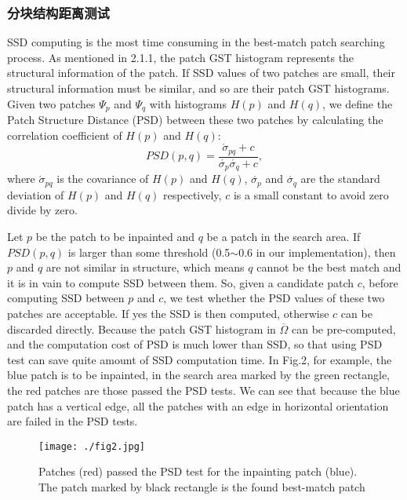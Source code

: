 \subsubsection{分块结构距离测试}
\label{sec:2.2.1}
SSD computing is the most time consuming in the best-match patch searching process. As mentioned in 2.1.1, the patch GST histogram represents the structural information of the patch. If SSD values of two patches are small, their structural information must be similar, and so are their patch GST histograms. Given two patches \(\Psi_p\) and \(\Psi_q\) with histograms \(H(p)\) and \(H(q)\), we define the Patch Structure Distance (PSD) between these two patches by calculating the correlation coefficient of \(H(p)\) and \(H(q)\):
$$PSD(p,q)=\frac{\acute{\sigma}_{pq}+c}{\acute{\sigma_p}\acute{\sigma_q}+c},$$
where \(\acute{\sigma}_{pq}\) is the covariance of \(H(p)\) and \(H(q)\), \(\acute{\sigma_p}\) and \(\acute{\sigma_q}\) are the standard deviation of \(H(p)\) and \(H(q)\) respectively, \(c\) is a small constant to avoid zero divide by zero.\par
Let \(p\) be the patch to be inpainted and \(q\) be a patch in the search area. If \(PSD(p,q)\) is larger than some threshold (0.5\(\sim\)0.6 in our implementation), then \(p\) and \(q\) are not similar in structure, which means \(q\) cannot be the best match and it is in vain to compute SSD between them. So, given a candidate patch \(c\), before computing SSD between \(p\) and \(c\), we test whether the PSD values of these two patches are acceptable. If yes the SSD is then computed, otherwise \(c\) can be discarded directly. Because the patch GST histogram in \(\overline{\Omega}\)  can be pre-computed, and the computation cost of PSD is much lower than SSD, so that using PSD test can save quite amount of SSD computation time. In Fig.2, for example, the blue patch is to be inpainted, in the search area marked by the green rectangle, the red patches are those passed the PSD tests. We can see that because the blue patch has a vertical edge, all the patches with an edge in horizontal orientation are failed in the PSD tests.
\begin{figure}[!htbp]
	\begin{center}
			\texttt{[image: ./fig2.jpg]}
	\end{center}
    \caption{Patches (red) passed the PSD test for the inpainting patch (blue). The patch marked by black rectangle is the found best-match patch}
	\label{fig:2}
\end{figure}
